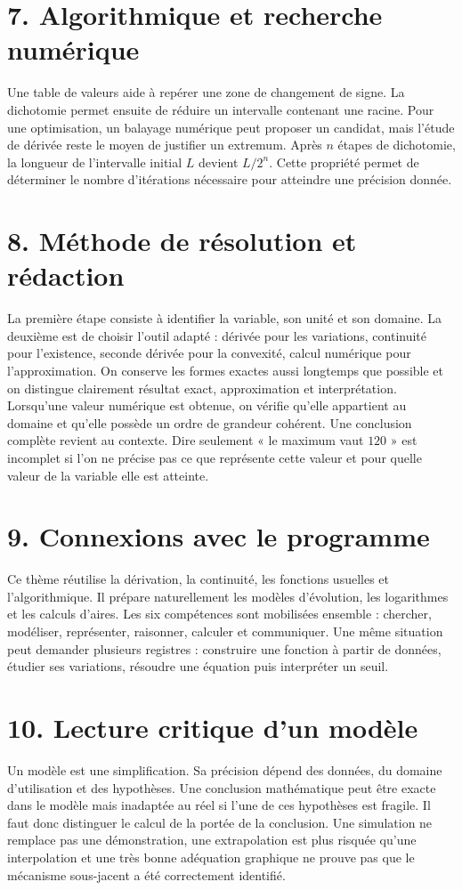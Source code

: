 \section{7. Algorithmique et recherche numérique}
Une table de valeurs aide à repérer une zone de changement de signe. La dichotomie permet ensuite de réduire un intervalle contenant une racine. Pour une optimisation, un balayage numérique peut proposer un candidat, mais l'étude de dérivée reste le moyen de justifier un extremum.
Après $n$ étapes de dichotomie, la longueur de l'intervalle initial $L$ devient $L/2^n$. Cette propriété permet de déterminer le nombre d'itérations nécessaire pour atteindre une précision donnée.
\section{8. Méthode de résolution et rédaction}
La première étape consiste à identifier la variable, son unité et son domaine. La deuxième est de choisir l'outil adapté : dérivée pour les variations, continuité pour l'existence, seconde dérivée pour la convexité, calcul numérique pour l'approximation.
On conserve les formes exactes aussi longtemps que possible et on distingue clairement résultat exact, approximation et interprétation. Lorsqu'une valeur numérique est obtenue, on vérifie qu'elle appartient au domaine et qu'elle possède un ordre de grandeur cohérent.
Une conclusion complète revient au contexte. Dire seulement « le maximum vaut $120$ » est incomplet si l'on ne précise pas ce que représente cette valeur et pour quelle valeur de la variable elle est atteinte.
\section{9. Connexions avec le programme}
Ce thème réutilise la dérivation, la continuité, les fonctions usuelles et l'algorithmique. Il prépare naturellement les modèles d'évolution, les logarithmes et les calculs d'aires. Les six compétences sont mobilisées ensemble : chercher, modéliser, représenter, raisonner, calculer et communiquer.
Une même situation peut demander plusieurs registres : construire une fonction à partir de données, étudier ses variations, résoudre une équation puis interpréter un seuil.
\section{10. Lecture critique d'un modèle}
Un modèle est une simplification. Sa précision dépend des données, du domaine d'utilisation et des hypothèses. Une conclusion mathématique peut être exacte dans le modèle mais inadaptée au réel si l'une de ces hypothèses est fragile.
Il faut donc distinguer le calcul de la portée de la conclusion. Une simulation ne remplace pas une démonstration, une extrapolation est plus risquée qu'une interpolation et une très bonne adéquation graphique ne prouve pas que le mécanisme sous-jacent a été correctement identifié.

